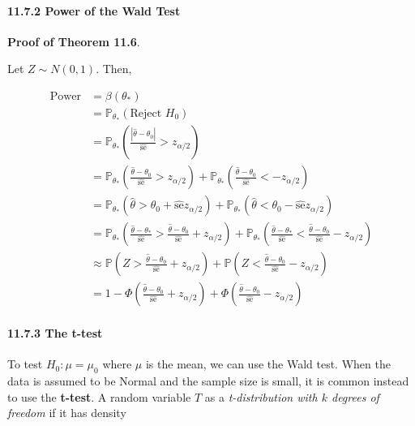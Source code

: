\paragraph{11.7.2 Power of the Wald Test}\label{power-of-the-wald-test}

\textbf{Proof of Theorem 11.6}.

Let \(Z \sim N(0, 1)\). Then,

\begin{align}
\text{Power} &= \beta(\theta_*) \\
&= \mathbb{P}_{\theta_*}(\text{Reject } H_0) \\
&= \mathbb{P}_{\theta_*}\left( \frac{|\hat{\theta} - \theta_0|}{\hat{\text{se}}} > z_{\alpha/2} \right) \\
&= \mathbb{P}_{\theta_*}\left( \frac{\hat{\theta} - \theta_0}{\hat{\text{se}}} > z_{\alpha/2} \right) 
+ \mathbb{P}_{\theta_*}\left( \frac{\hat{\theta} - \theta_0}{\hat{\text{se}}} < -z_{\alpha/2} \right) \\
&= \mathbb{P}_{\theta_*}(\hat{\theta} > \theta_0 + \hat{\text{se}} z_{\alpha/2})
+ \mathbb{P}_{\theta_*}(\hat{\theta} < \theta_0 - \hat{\text{se}} z_{\alpha/2}) \\
&= \mathbb{P}_{\theta_*}\left( \frac{\hat{\theta} - \theta_*}{\hat{\text{se}}} > \frac{\hat{\theta} - \theta_0}{\hat{\text{se}}} + z_{\alpha/2} \right) 
+ \mathbb{P}_{\theta_*}\left( \frac{\hat{\theta} - \theta_*}{\hat{\text{se}}} < \frac{\hat{\theta} - \theta_0}{\hat{\text{se}}} - z_{\alpha/2} \right) \\
& \approx \mathbb{P}\left(Z > \frac{\hat{\theta} - \theta_0}{\hat{\text{se}}} + z_{\alpha/2} \right) 
+ \mathbb{P}\left(Z < \frac{\hat{\theta} - \theta_0}{\hat{\text{se}}} - z_{\alpha/2} \right) \\
&= 1 - \Phi\left( \frac{\hat{\theta} - \theta_0}{\hat{\text{se}}} + z_{\alpha/2} \right) 
+ \Phi\left( \frac{\hat{\theta} - \theta_0}{\hat{\text{se}}} - z_{\alpha/2} \right)
\end{align}

\paragraph{11.7.3 The t-test}\label{the-t-test}

To test \(H_0: \mu = \mu_0\) where \(\mu\) is the mean, we can use the
Wald test. When the data is assumed to be Normal and the sample size is
small, it is common instead to use the \textbf{t-test}. A random
variable \(T\) as a \emph{t-distribution with \(k\) degrees of freedom}
if it has density

